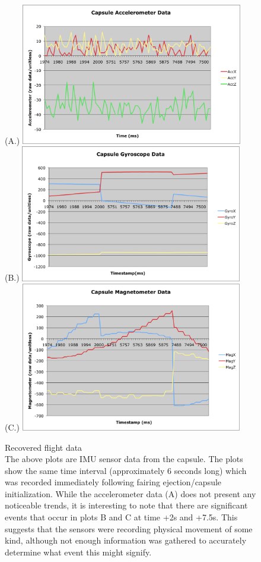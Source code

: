 \documentclass{article}
\begin{document}
\newpage
	\begin{figure}[H]
	\begin{center}
		(A.)
		\includegraphics[width=9.7cm]{RawAccel}\\
		(B.)
		\includegraphics[width=9.7cm]{RawGyro}\\
		(C.)
		\includegraphics[width=9.7cm]{RawMag}\\
	\end{center}
		\caption{}
		\label{raw}
Recovered flight data\\ The above plots are IMU sensor data from the capsule. The plots show the same time interval (approximately 6 seconds long) which was recorded immediately following fairing ejection/capsule initialization. While the accelerometer data (A) does not present any noticeable trends, it is interesting to note that there are significant events that occur in plots B and C at time +2s and +7.5s. This suggests that the sensors were recording physical movement of some kind, although not enough information was gathered to accurately determine what event this might signify.
	\end{figure}
\newpage
\end{document}
